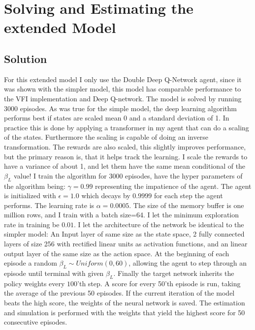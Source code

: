 \section{Solving and Estimating the extended Model}

\subsection{Solution}

For this extended model I only use the Double Deep Q-Network agent, since it was shown with the simpler model, this model has comparable performance to the VFI implementation and Deep Q-network. The model is solved by running 3000 episodes. As was true for the simple model, the deep learning algorithm performs best if states are scaled mean 0 and a standard deviation of 1. In practice this is done by applying a transformer in my agent that can do a scaling of the states. Furthermore the scaling is capable of doing an inverse transformation. The rewards are also scaled, this slightly improves performance, but the primary reason is, that it helps track the learning. I scale the rewards to have a variance of about 1, and let them have the same mean conditional of the $\beta_L$  value! I train the algorithm for 3000 episodes, have the hyper parameters of the algorithm being: $\gamma=0.99$ representing the impatience of the agent. The agent is initialized with $\epsilon=1.0$ which decays by $0.9999$ for each step the agent performs. The learning rate is $\alpha=0.0005$. The size of the memory buffer is one million rows, and I train with a batch size=64. I let the minimum exploration rate in training be $0.01$. I let the architecture of the network be identical to the simpler model: An Input layer of same size as the state space, 2 fully connected layers of size 256 with rectified linear units as activation functions, and an linear output layer of the same size as the action space. At the beginning of each episode a random $\beta_L \sim Uniform(0, 60)$, allowing the agent to step through an episode until terminal with given $\beta_L$. Finally the target network inherits the policy weights every $100$'th step. A score for every 50'th episode is run, taking the average of the previous 50 episodes. If the current iteration of the model beats the high score, the weights of the neural network is saved. The estimation and simulation is performed with the weights that yield the highest score for 50 consecutive episodes. 

